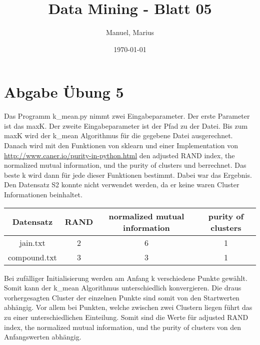 \documentclass{article}
\title{Data Mining - Blatt 05}
\author{Manuel, Marius}
\date{\today}
\begin{document}
\maketitle

\section{Abgabe Übung 5}
Das Programm k\_mean.py nimmt zwei Eingabeparameter. Der erste Parameter ist das maxK. Der zweite Eingabeparameter ist der Pfad zu der Datei. Bis zum maxK wird der k\_mean Algorithmus für die gegebene Datei ausgerechnet. Danach wird mit den Funktionen von sklearn und einer Implementation von \url{http://www.caner.io/purity-in-python.html} den adjusted RAND index, the normalized mutual information, und the purity of clusters und berrechnet. Das beste k wird dann für jede dieser Funktionen bestimmt. Dabei war das Ergebnis. Den Datensatz S2 konnte nicht verwendet werden, da er keine waren Cluster Informationen beinhaltet.

\begin{center}
  \begin{tabular}{ c | c | c | c }
    Datensatz & RAND & normalized mutual information & purity of clusters \\ 
    \hline
    jain.txt & 2 & 6 & 1 \\
    compound.txt & 3 & 3 & 1 \\
  \end{tabular}
\end{center}

Bei zufälliger Initialisierung werden am Anfang k verschiedene Punkte gewählt. Somit kann der k\_mean Algorithmus unterschiedlich konvergieren. Die draus vorhergesagten Cluster der einzelnen Punkte sind somit von den Startwerten abhängig. Vor allem bei Punkten, welche zwischen zwei Clustern liegen führt das zu einer unterschiedlichen Einteilung. Somit sind die Werte für adjusted RAND index, the normalized mutual information, und the purity of clusters von den Anfangswerten abhängig.
\end{document}
